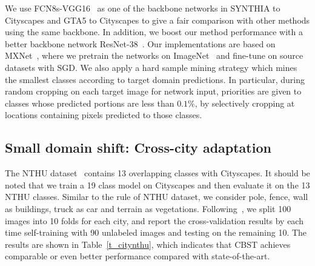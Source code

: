 \documentclass[runningheads]{llncs}
\begin{document}
We use FCN8s-VGG16~\cite{long2015fully} as one of the backbone networks in SYNTHIA to Cityscapes and GTA5 to Cityscapes to give a fair comparison with other methods using the same backbone. In addition, we boost our method performance with a better backbone network ResNet-38~\cite{wu2016wider}. Our implementations are based on MXNet~\cite{chen2015mxnet}, where we pretrain the networks on ImageNet~\cite{russakovsky2015imagenet} and fine-tune on source datasets with SGD. We also apply a hard sample mining strategy which mines the smallest classes according to target domain predictions. In particular, during random cropping on each target image for network input, priorities are given to classes whose predicted portions are less than $0.1\%$, by selectively cropping at locations containing pixels predicted to those classes.

\subsection{Small domain shift: Cross-city adaptation}
The NTHU dataset~\cite{Chen_2017_ICCV} contains 13 overlapping classes with Cityscapes. It should be noted that we train a 19 class model on Cityscapes and then evaluate it on the 13 NTHU classes. Similar to the rule of NTHU dataset, we consider pole, fence, wall as buildings, truck as car and terrain as vegetations. Following~\cite{Chen_2017_ICCV}, we split 100 images into 10 folds for each city, and report the cross-validation results by each time self-training with 90 unlabeled images and testing on the remaining 10. The results are shown in Table~\ref{t_citynthu}, which indicates that CBST achieves comparable or even better performance compared with state-of-the-art.
\end{document}
